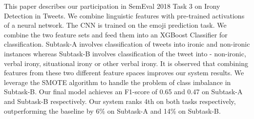 This paper describes our participation in SemEval 2018 Task 3 on Irony Detection in Tweets. We combine linguistic features with pre-trained activations of a neural network. The CNN is trained on the emoji prediction task. We combine the two feature sets and feed them into an XGBoost Classifier for classification. Subtask-A involves classification of tweets into ironic and non-ironic instances whereas Subtask-B involves classification of the tweet into - non-ironic, verbal irony, situational irony or other verbal irony. It is observed that combining features from these two different feature spaces improves our system results. We leverage the SMOTE algorithm to handle the problem of class imbalance in Subtask-B. Our final model achieves an F1-score of 0.65 and 0.47 on Subtask-A and Subtask-B respectively. Our system ranks  4th  on both tasks respectively, outperforming the baseline by 6\% on Subtask-A and 14\% on Subtask-B.
